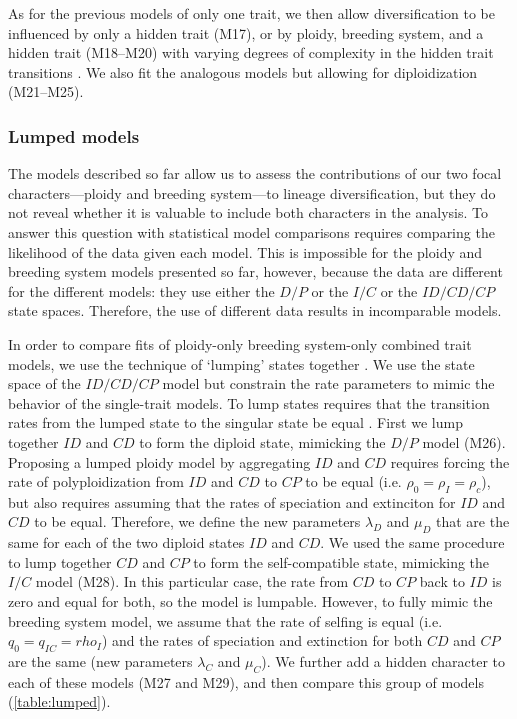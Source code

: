 As for the previous models of only one trait, we then allow diversification to be influenced by only a hidden trait (M17), or by ploidy, breeding system, and a hidden trait (M18--M20) with varying degrees of complexity in the hidden trait transitions
\citep[similar to][]{caetano_2018, huang_2018}. %
We also fit the analogous models but allowing for diploidization (M21--M25).

\subsubsection{Lumped models}

The models described so far allow us to assess the contributions of our two focal characters---ploidy and breeding system---to lineage diversification, but they do not reveal whether it is valuable to include both characters in the analysis.
To answer this question with statistical model comparisons requires comparing the likelihood of the data given each model.
This is impossible for the ploidy and breeding system models presented so far, however, because the data are different for the different models: they use either the $D/P$ or the $I/C$ or the $ID/CD/CP$ state spaces.
Therefore, the use of different data results in incomparable models.

In order to compare fits of ploidy-only \vs breeding system-only \vs combined trait models, we use the technique of `lumping' states together \citep{tarasov_2019}.
We use the state space of the $ID/CD/CP$ model but constrain the rate parameters to mimic the behavior of the single-trait models.
To lump states requires that the transition rates from the lumped state to the singular state be equal \citep{tarasov_2019}.
First we lump together $ID$ and $CD$ to form the diploid state, mimicking the $D/P$ model (M26). 
Proposing a lumped ploidy model by aggregating $ID$ and $CD$ requires forcing the rate of polyploidization from $ID$ and $CD$ to $CP$ to be equal (i.e. $\rho_0=\rho_I=\rho_c$), but also requires
assuming that the rates of speciation and extinciton for $ID$ and $CD$ to be equal.
Therefore, we define the new parameters $\lambda_D$ and $\mu_D$  that are the same for each of the two diploid states $ID$ and $CD$.%
We used the same procedure to lump together $CD$ and $CP$ to form the self-compatible state, mimicking the $I/C$ model (M28).
In this particular case, the rate from $CD$ to $CP$ back to $ID$ is zero and equal for both, so the model is lumpable. 
However, to fully mimic the breeding system model, we assume that the rate of selfing is equal (i.e. $q_0=q_{IC}=rho_I$) and the rates
of speciation and extinction for both $CD$ and $CP$ are the same (new parameters $\lambda_C$ and $\mu_C$).
We further add a hidden character to each of these models (M27 and M29), and then compare this group of models (\cref{table:lumped}).


